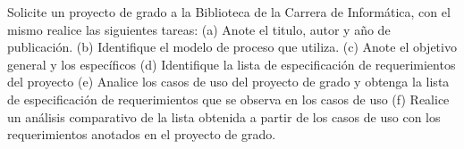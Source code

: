 Solicite un proyecto de grado a la Biblioteca de la Carrera de Informática, con el mismo realice las siguientes tareas: (a) Anote el titulo, autor y año de publicación. (b) Identifique el modelo de proceso que utiliza. (c) Anote el objetivo general y los específicos (d) Identifique la lista de especificación de requerimientos del proyecto (e) Analice los casos de uso del proyecto de grado y obtenga la lista de especificación de requerimientos que se observa en los casos de uso (f) Realice un análisis comparativo de la lista obtenida a partir de los casos de uso con los requerimientos anotados en el proyecto de grado.
